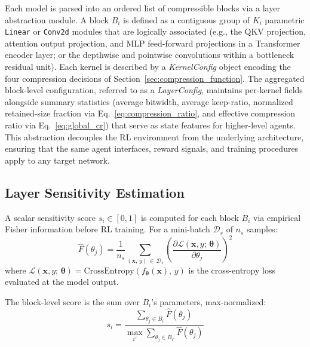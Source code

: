 \documentclass[preprint,12pt,authoryear]{elsarticle}
\begin{document}
Each model is parsed into an ordered list of compressible blocks via a layer abstraction
module. A block $B_i$ is defined as a contiguous group of $K_i$ parametric
\texttt{Linear} or \texttt{Conv2d} modules that are logically associated (e.g., the QKV
projection, attention output projection, and MLP feed-forward projections in a
Transformer encoder layer; or the depthwise and pointwise convolutions within a
bottleneck residual unit). Each kernel is described by a \textit{KernelConfig} object
encoding the four compression decisions of Section~\ref{sec:compression_function}.
The aggregated block-level configuration, referred to as a \textit{LayerConfig},
maintains per-kernel fields alongside summary statistics (average bitwidth, average
keep-ratio, normalized retained-size fraction via Eq.~\eqref{eq:compression_ratio},
and effective compression ratio via Eq.~\eqref{eq:global_cr}) that serve as state
features for higher-level agents. This abstraction decouples the RL
environment from the underlying architecture, ensuring that the same agent interfaces,
reward signals, and training procedures apply to any target network.

\subsection{Layer Sensitivity Estimation}

A scalar sensitivity score $s_i \in [0,1]$ is computed for each block $B_i$ via
empirical Fisher information before RL training. For a mini-batch $\mathcal{D}_s$ of
$n_s$ samples:
\begin{equation}
    \hat{F}(\theta_j) = \frac{1}{n_s}
    \sum_{(\mathbf{x},\, y)\,\in\,\mathcal{D}_s}
    \left( \frac{\partial \mathcal{L}(\mathbf{x}, y;\, \boldsymbol{\theta})}
                {\partial \theta_j} \right)^{\!2}
    \label{eq:fisher}
\end{equation}
where $\mathcal{L}(\mathbf{x}, y;\,\boldsymbol{\theta})=\mathrm{CrossEntropy}(f_{\boldsymbol{\theta}}(\mathbf{x}),\,y)$ is the cross-entropy loss evaluated at the model output.

\noindent The block-level score is the sum over $B_i$'s parameters, max-normalized:
\begin{equation}
    s_i = \frac{\displaystyle\sum_{\theta_j \in B_i} \hat{F}(\theta_j)}
               {\displaystyle\max_{i'} \sum_{\theta_j \in B_{i'}} \hat{F}(\theta_j)}
    \label{eq:sensitivity_score}
\end{equation}
\end{document}

